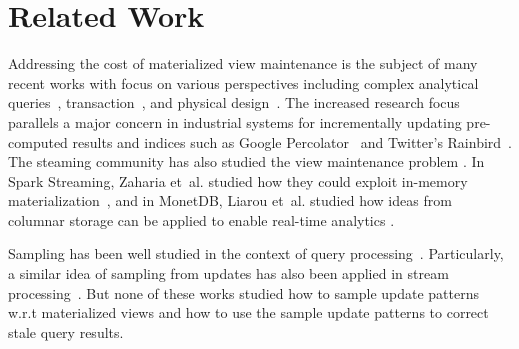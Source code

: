 \vspace{-.5em}
\section{Related Work}\label{related}
\vspace{-.25em}
Addressing the cost of materialized view maintenance is the subject of many recent works with
focus on various perspectives including complex analytical queries~\cite{nikolic2014linview}, transaction~\cite{bailis2014scalable}, and physical design~\cite{lefevre2014opportunistic}.
The increased research focus parallels a major concern in industrial systems for incrementally updating pre-computed results and indices such as Google Percolator~\cite{percolator} and Twitter's Rainbird~\cite{rainbird}.
The steaming community has also studied the view maintenance problem \cite{abadi2003aurora,golab2011consistency, golab2012scalable, he2010comet, ghanem2010supporting, KrishnamurthyFDFGLT10}. In Spark Streaming, Zaharia et~al. studied how they could exploit in-memory materialization~\cite{zaharia2012discretized}, and in MonetDB, Liarou et~al. studied how ideas from columnar storage can be applied to enable real-time analytics \cite{liarou2012monetdb}.


Sampling has been well studied in the context of query processing~\cite{agarwal2013blinkdb, olken1993random, garofalakis2001approximate}. Particularly, a similar idea of sampling from updates has also been applied in stream processing~\cite{tatbul2003load, Garofalakis, rabkin2014aggregation}. But none of these works studied how to sample update patterns w.r.t materialized views and how to use the sample update patterns to correct stale query results.

